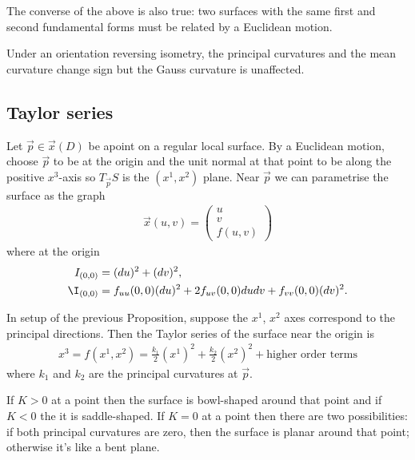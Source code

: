 \documentclass{article}
\begin{document}
\begin{theorem}
	The converse of the above is also true: two surfaces with the same first and second
	fundamental forms must be related by a Euclidean motion.
\end{theorem}

\begin{proposition}[Notes 9.9]
	Under an orientation reversing isometry, the principal curvatures and the mean curvature
	change sign but the Gauss curvature is unaffected.
\end{proposition}

\subsection{Taylor series}

\begin{proposition}[Notes 9.10]
	Let $\vec p \in \vec x(D)$ be apoint on a regular local surface. By a Euclidean motion,
	choose $\vec p$ to be at the origin and the unit normal at that point to be along the positive
	$x^3$-axis so $T_{\vec p}S$ is the $(x^1,x^2)$ plane. Near $\vec p$ we can parametrise
	the surface as the graph
	\begin{align*}
		\vec x(u,v)=\begin{pmatrix}
			u \\ v \\ f(u,v)
		\end{pmatrix}
	\end{align*}
	where at the origin
	\begin{align*}
		I_{(0,0)}  & =(du)^2+(dv)^2,                                        \\
		\I_{(0,0)} & =f_{uu}(0,0)(du)^2+2f_{uv}(0,0)dudv+f_{vv}(0,0)(dv)^2.
	\end{align*}
\end{proposition}

\begin{proposition}[Notes 9.11]
	In setup of the previous Proposition, suppose the $x^1$, $x^2$ axes correspond
	to the principal directions. Then the Taylor series of the surface near the origin
	is
	\begin{align*}
		x^3 = f(x^1, x^2) = \frac{k_1}{2}(x^1)^2 + \frac{k_2}{2}(x^2)^2 + \text{higher order terms}
	\end{align*}
	where $k_1$ and $k_2$ are the principal curvatures at $\vec p$.
\end{proposition}

\begin{corollary}[Notes 9.12]
	If $K>0$ at a point then the surface is bowl-shaped around that point and if $K<0$ the it is
	saddle-shaped. If $K=0$ at a point then there are two possibilities: if both principal
	curvatures are zero, then the surface is planar around that point; otherwise it's like
	a bent plane.
\end{corollary}
\end{document}
